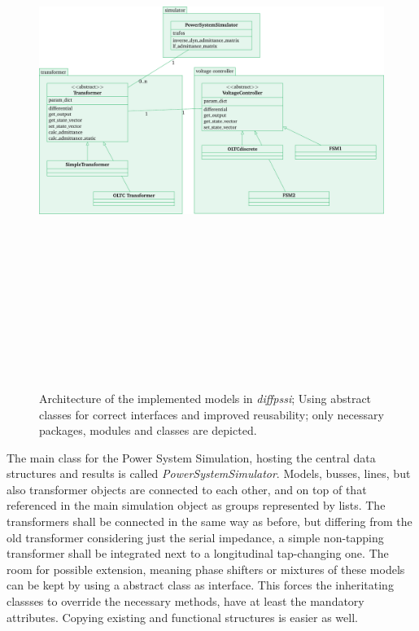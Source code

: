 \begin{figure}[htbp!]
        \centering
        \includegraphics[angle=90, height=18cm]{./tikz_graphics/images/software_structure.pdf}%
        \caption[Architecture of the implemented models in \textit{diffpssi}]{Architecture of the implemented models in \textit{diffpssi}; Using abstract classes for correct interfaces and improved reusability; only necessary packages, modules and classes are depicted.}
        \label{fig:transformer-architecture}
\end{figure}

The main class for the Power System Simulation, hosting the central data structures and results is called \textit{PowerSystemSimulator}.
Models, busses, lines, but also transformer objects are connected to each other, and on top of that referenced in the main simulation object as groups represented by lists.
The transformers shall be connected in the same way as before, but differing from the old transformer considering just the serial impedance, a simple non-tapping transformer shall be integrated next to a longitudinal tap-changing one.
The room for possible extension, meaning phase shifters or mixtures of these models can be kept by using a abstract class as interface.
This forces the inheritating classses to override the necessary methods, have at least the mandatory attributes.
Copying existing and functional structures is easier as well.

